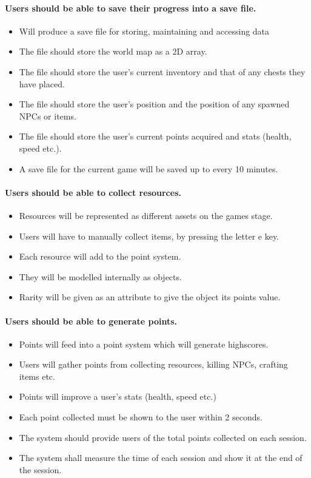\documentclass{article}
\begin{document}
\paragraph{Users should be able to save their progress into a save file.}
\begin{itemize}
	\item Will produce a save file for storing, maintaining and accessing data
	\item The file should store the world map as a 2D array.
	\item The file should store the user’s current inventory and that of any chests they have placed.
	\item The file should store the user’s position and the position of any spawned NPCs or items.
	\item The file should store the user’s current points acquired and stats (health, speed etc.).
	\item A save file for the current game will be saved up to every 10 minutes.
\end{itemize}

\paragraph{Users should be able to collect resources.}
\begin{itemize}
	\item Resources will be represented as different assets on the games stage.
	\item Users will have to manually collect items, by pressing the letter e key.
	\item Each resource will add to the point system.
	\item They will be modelled internally as objects.
	\item Rarity will be given as an attribute to give the object its points value.
\end{itemize}

\paragraph{Users should be able to generate points.}
\begin{itemize}
	\item Points will feed into a point system which will generate highscores.
	\item Users will gather points from collecting resources, killing NPCs, crafting items etc.
	\item Points will improve a user's stats (health, speed etc.)
	\item Each point collected must be shown to the user within 2 seconds.
	\item The system should provide users of the total points collected on each session.
	\item The system shall measure the time of each session and show it at the end of the session.
\end{itemize}
\end{document}
